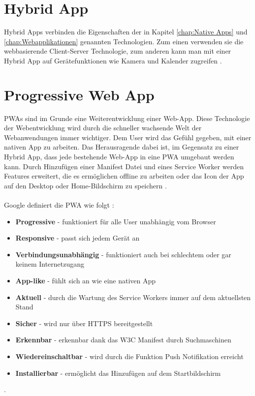 \section{Hybrid App}
Hybrid Apps verbinden die Eigenschaften der in Kapitel \ref{chap:Native Apps} und \ref{chap:Webapplikationen} genannten Technologien. Zum einen verwenden sie die webbasierende Client-Server Technologie, zum anderen kann man mit einer Hybrid App auf Gerätefunktionen wie Kamera und Kalender zugreifen \cite{HybridApps}. 

\section{Progressive Web App}\label{chap:ProgressiveWebapplikationen}
\acl{PWA}s sind im Grunde eine Weiterentwicklung einer \acs{Web-App}. Diese Technologie der Webentwicklung wird durch die schneller wachsende Welt der Webanwendungen immer wichtiger. 
Dem User wird das Gefühl gegeben, mit einer nativen App zu arbeiten. Das Herausragende dabei ist, im Gegensatz zu einer Hybrid App, dass jede bestehende \acs{Web-App} in eine \acs{PWA} umgebaut werden kann.
Durch Hinzufügen einer Manifest Datei und eines Service Worker werden Features erweitert, die es ermöglichen offline zu arbeiten oder das Icon der App auf den Desktop oder Home-Bildschirm zu speichern \cite{PWA} \cite{PWAAdjectives}.\\ \\
Google definiert die \acs{PWA} wie folgt :
\begin{itemize}
    \item  \textbf{Progressive} - funktioniert für alle User unabhängig vom Browser
	\item  \textbf{Responsive} - passt sich jedem Gerät an	
	\item  \textbf{Verbindungsunabhängig} - funktioniert auch bei schlechtem oder gar keinem Internetzugang
	\item  \textbf{App-like} - fühlt sich an wie eine nativen App
	\item  \textbf{Aktuell} - durch die Wartung des Service Workers immer auf dem aktuellsten Stand
	\item  \textbf{Sicher} - wird nur über HTTPS bereitgestellt
	\item  \textbf{Erkennbar} - erkennbar dank das W3C Manifest durch Suchmaschinen
	\item  \textbf{Wiedereinschaltbar} - wird durch die Funktion Push Notifikation erreicht
	\item  \textbf{Installierbar} - ermöglicht das Hinzufügen auf dem Startbildschirm
\end{itemize}. 


